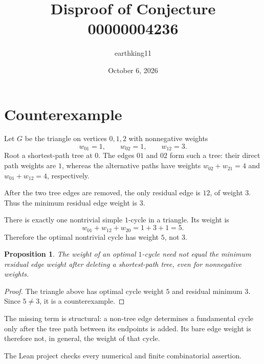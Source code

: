\documentclass[11pt]{article}
\title{Disproof of Conjecture 00000004236}
\author{earthking11}
\date{October 6, 2026}
\newtheorem{proposition}{Proposition}
\begin{document}
\maketitle
\section*{Counterexample}
Let $G$ be the triangle on vertices $0,1,2$ with nonnegative weights
\[
 w_{01}=1,\qquad w_{02}=1,\qquad w_{12}=3.
\]
Root a shortest-path tree at $0$.  The edges $01$ and $02$ form such a tree:
their direct path weights are $1$, whereas the alternative paths have weights
$w_{02}+w_{21}=4$ and $w_{01}+w_{12}=4$, respectively.

After the two tree edges are removed, the only residual edge is $12$, of
weight $3$.  Thus the minimum residual edge weight is $3$.

There is exactly one nontrivial simple $1$-cycle in a triangle.  Its weight is
\[
 w_{01}+w_{12}+w_{20}=1+3+1=5.
\]
Therefore the optimal nontrivial cycle has weight $5$, not $3$.

\begin{proposition}
The weight of an optimal $1$-cycle need not equal the minimum residual edge
weight after deleting a shortest-path tree, even for nonnegative weights.
\end{proposition}
\begin{proof}
The triangle above has optimal cycle weight $5$ and residual minimum $3$.
Since $5\ne3$, it is a counterexample.
\end{proof}

The missing term is structural: a non-tree edge determines a fundamental
cycle only after the tree path between its endpoints is added.  Its bare edge
weight is therefore not, in general, the weight of that cycle.

The Lean project checks every numerical and finite combinatorial assertion.
\end{document}

